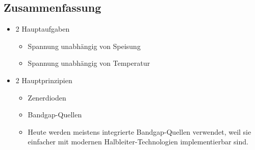 \subsection{Zusammenfassung}
\begin{itemize}
  \item 2 Hauptaufgaben
  \begin{itemize}
    \item Spannung unabhängig von Speisung
    \item Spannung unabhängig von Temperatur
  \end{itemize}
  \item 2 Hauptprinzipien
  \begin{itemize}
    \item Zenerdioden
    \item Bandgap-Quellen
    \item Heute werden meistens integrierte Bandgap-Quellen verwendet, weil sie
    einfacher mit modernen Halbleiter-Technologien implementierbar sind.
    \end{itemize}
\end{itemize}
